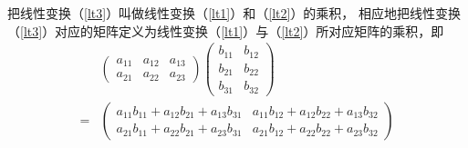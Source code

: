 \begin{frame}
  \begin{footnotesize}
    把线性变换（\ref{lt3}）叫做线性变换（\ref{lt1}）和（\ref{lt2}）的乘积，
    相应地把线性变换（\ref{lt3}）对应的矩阵定义为线性变换（\ref{lt1}）与（\ref{lt2}）所对应矩阵的乘积，即
    $$
    \begin{array}{ll}
      & \left(
        \begin{array}{lll}
          a_{11} & a_{12} & a_{13}\\[0.1cm]
          a_{21} & a_{22} & a_{23}
        \end{array}
                            \right)
                            \left(
                            \begin{array}{ll}
                              b_{11} & b_{12} \\[0.1cm]
                              b_{21} & b_{22} \\[0.1cm]
                              b_{31} & b_{32} 
                            \end{array}
                                       \right) \\[0.8cm]
      = & \left(
          \begin{array}{cc}
            a_{11}b_{11} + a_{12}b_{21} + a_{13}b_{31}  &  a_{11}b_{12} + a_{12}b_{22} + a_{13}b_{32} \\[0.1cm]
            a_{21}b_{11} + a_{22}b_{21} + a_{23}b_{31}  &  a_{21}b_{12} + a_{22}b_{22} + a_{23}b_{32}
          \end{array}
                                                          \right)
    \end{array}
    $$
  \end{footnotesize}
\end{frame}

